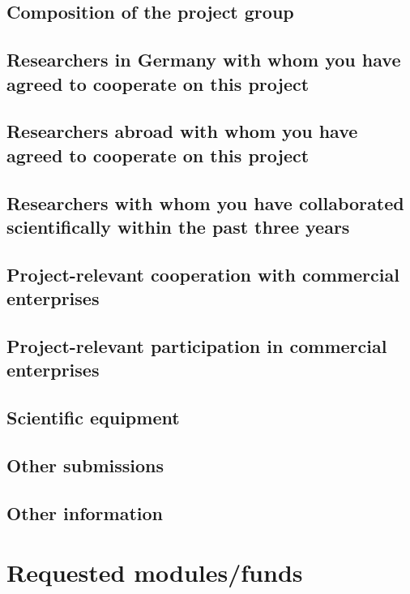 \documentclass[english, 53.01]{proposal}
\begin{document}
\subsection{Composition of the project group}

\subsection{Researchers in Germany with whom you have agreed to cooperate on this project}

\subsection{Researchers abroad with whom you have agreed to cooperate on this project}

\subsection{Researchers with whom you have collaborated scientifically within the past three years}

\subsection{Project-relevant cooperation with commercial enterprises}

\subsection{Project-relevant participation in commercial enterprises}

\subsection{Scientific equipment}

\subsection{Other submissions}

\subsection{Other information}


\section{Requested modules/funds}
\end{document}
